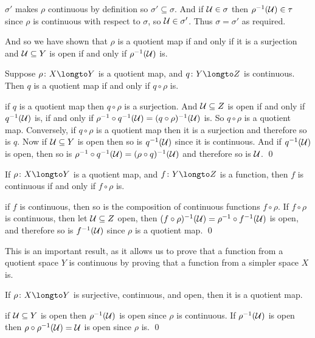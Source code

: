 $\sigma'$ makes $\rho$ continuous by definition so $\sigma'\subseteq\sigma$.
And if ${\cal U}\in\sigma$ then $\rho^{-1}({\cal U})\in\tau$ since $\rho$ is continuous with respect to $\sigma$, so ${\cal U}\in\sigma'$.
Thus $\sigma=\sigma'$ as required.

And so we have shown that $\rho$ is a quotient map if and only if it is a surjection and ${\cal U}\subseteq Y$ is open if and only if $\rho^{-1}({\cal U})$ is.

\bprop

    Suppose $\rho\colon X\longto Y$ is a quotient map, and $q\colon Y\longto Z$ is continuous.
    Then $q$ is a quotient map if and only if $q\circ\rho$ is.

\eprop

\Proof if $q$ is a quotient map then $q\circ\rho$ is a surjection.
And ${\cal U}\subseteq Z$ is open if and only if $q^{-1}({\cal U})$ is, if and only if $\rho^{-1}\circ q^{-1}({\cal U})=(q\circ\rho)^{-1}({\cal U})$ is.
So $q\circ\rho$ is a quotient map.
Conversely, if $q\circ\rho$ is a quotient map then it is a surjection and therefore so is $q$.
Now if ${\cal U}\subseteq Y$ is open then so is $q^{-1}({\cal U})$ since it is continuous.
And if $q^{-1}({\cal U})$ is open, then so is $\rho^{-1}\circ q^{-1}({\cal U})=(\rho\circ q)^{-1}({\cal U})$ and therefore so is ${\cal U}$.
\qed

\bprop

    If $\rho\colon X\longto Y$ is a quotient map, and $f\colon Y\longto Z$ is a function, then $f$ is continuous if and only if $f\circ\rho$ is.

\eprop

\Proof if $f$ is continuous, then so is the composition of continuous functions $f\circ\rho$.
If $f\circ\rho$ is continuous, then let ${\cal U}\subseteq Z$ open, then $(f\circ\rho)^{-1}({\cal U})=\rho^{-1}\circ f^{-1}({\cal U})$ is open, and therefore so is $f^{-1}({\cal U})$ since $\rho$ is a quotient map.
\qed

This is an important result, as it allows us to prove that a function from a quotient space $Y$ is continuous by proving that a function from a simpler space $X$ is.

\bprop

    If $\rho\colon X\longto Y$ is surjective, continuous, and open, then it is a quotient map.

\eprop

\Proof if ${\cal U}\subseteq Y$ is open then $\rho^{-1}({\cal U})$ is open since $\rho$ is continuous.
If $\rho^{-1}({\cal U})$ is open then $\rho\circ\rho^{-1}({\cal U})={\cal U}$ is open since $\rho$ is.
\qed

